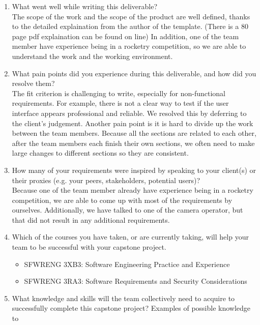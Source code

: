 \documentclass[12pt]{article}
\begin{document}
\begin{enumerate}
  \item What went well while writing this deliverable?\\ The scope of the work and the
        scope of the product are well defined, thanks to the detailed explaination from
        the author of the template. (There is a 80 page pdf explaination can be found
        on line) In addition, one of the team member have experience being in a
        rocketry competition, so we are able to understand the work and the working
        environment.
  \item What pain points did you experience during this deliverable, and how did you
        resolve them? \\ The fit criterion is challenging to write, especially for
        non-functional requirements. For example, there is not a clear way to test if
        the user interface appears professional and reliable. We resolved this by
        deferring to the client's judgement. Another pain point is it is hard to divide
        up the work between the team members. Because all the sections are related to
        each other, after the team members each finish their own sections, we often
        need to make large changes to different sections so they are consistent.
  \item How many of your requirements were inspired by speaking to your client(s) or
        their proxies (e.g. your peers, stakeholders, potential users)? \\ Because one
        of the team member already have experience being in a rocketry competition, we
        are able to come up with most of the requirements by ourselves. Additionally,
        we have talked to one of the camera operator, but that did not result in any
        additional requirements.
  \item Which of the courses you have taken, or are currently taking, will help your
        team to be successful with your capstone project.
        \begin{itemize}
          \item SFWRENG 3XB3: Software Engineering Practice and Experience
          \item SFWRENG 3RA3: Software Requirements and Security Considerations
        \end{itemize}
  \item What knowledge and skills will the team collectively need to acquire to
        successfully complete this capstone project? Examples of possible knowledge to

\end{enumerate}
\end{document}
